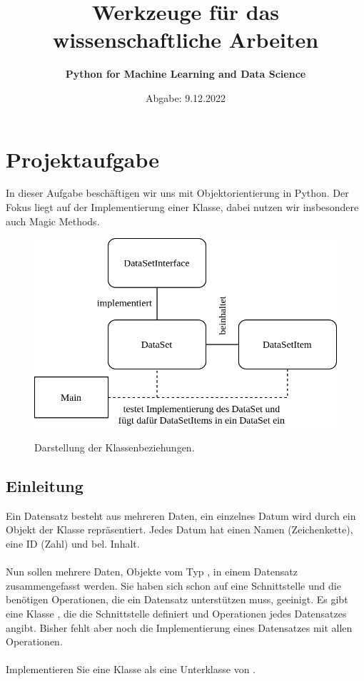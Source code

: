 \documentclass{article}
\begin{document}
	\title{\bf Werkzeuge für das wissenschaftliche Arbeiten}
	\author{\bf Python for Machine Learning and Data Science}
	\date{Abgabe: 9.12.2022}
	\maketitle
	
	\tableofcontents
	
	\section{Projektaufgabe}
		In dieser Aufgabe beschäftigen wir uns mit Objektorientierung in Python.
		Der Fokus liegt auf der Implementierung einer Klasse, dabei nutzen wir insbesondere auch Magic Methods.
		
		\begin{figure}[H] %
			\centering
			\includegraphics[scale=0.35]{../diagram/classes_files.png}
			\bf\caption{\normalfont Darstellung der Klassenbeziehungen.} %
		\end{figure}

		\subsection{Einleitung}
			Ein Datensatz besteht aus mehreren Daten, ein einzelnes Datum wird durch ein Objekt der Klasse \grqq{} repräsentiert.
			Jedes Datum hat einen Namen (Zeichenkette), eine ID (Zahl) und bel. Inhalt.\\
			\\
			Nun sollen mehrere Daten, Objekte vom Typ \grqq{}, in einem Datensatz zusammengefasst werden.
			Sie haben sich schon auf eine Schnittstelle und die benötigen Operationen, die ein Datensatz unterstützen muss, geeinigt.
			Es gibt eine Klasse \grqq{}, die die Schnittstelle definiert und Operationen jedes Datensatzes angibt.
			Bisher fehlt aber noch die Implementierung eines Datensatzes mit allen Operationen.\\
			\\
			Implementieren Sie eine Klasse \grqq{} als eine Unterklasse von \grqq{}.\\
	
\end{document}
